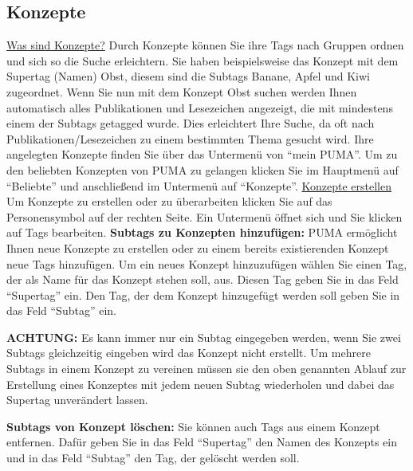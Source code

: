 \documentclass[b5paper,11pt,twoside]{scrbook} %
\begin{document}
\subsection{Konzepte}
\underline{Was sind Konzepte?}
\newline
Durch Konzepte können Sie ihre Tags nach Gruppen ordnen und sich so die Suche erleichtern. Sie haben beispielsweise das Konzept mit dem Supertag (Namen) Obst, diesem sind die Subtags Banane, Apfel und Kiwi zugeordnet. Wenn Sie nun mit dem Konzept Obst suchen werden Ihnen automatisch alles Publikationen und Lesezeichen angezeigt, die mit mindestens einem der Subtags getagged wurde. Dies erleichtert Ihre Suche, da oft nach Publikationen/Lesezeichen zu einem bestimmten Thema gesucht wird. 
\newline Ihre angelegten Konzepte finden Sie über das Untermenü von \enquote{mein PUMA}. Um zu den beliebten Konzepten von PUMA zu gelangen klicken Sie im Hauptmenü auf \enquote{Beliebte} und anschließend im Untermenü auf \enquote{Konzepte}. 
\newline
\newline
\underline{Konzepte erstellen}
\newline
Um Konzepte zu erstellen oder zu überarbeiten klicken Sie auf das Personensymbol auf der rechten Seite. Ein Untermenü öffnet sich und Sie klicken auf Tags bearbeiten. 
\newline
\newline %
\textbf{Subtags zu Konzepten hinzufügen:} PUMA ermöglicht Ihnen neue Konzepte zu erstellen oder zu einem bereits existierenden Konzept neue Tags hinzufügen. Um ein neues Konzept hinzuzufügen wählen Sie einen Tag, der als Name für das Konzept stehen soll, aus. Diesen Tag geben Sie in das Feld \enquote{Supertag} ein. Den Tag, der dem Konzept hinzugefügt werden soll geben Sie in das Feld \enquote{Subtag} ein.
\begin{shaded} \centering\textbf{ACHTUNG:} Es kann immer nur ein Subtag eingegeben werden, wenn Sie zwei Subtags gleichzeitig eingeben wird das Konzept nicht erstellt. Um mehrere Subtags in einem Konzept zu vereinen müssen sie den oben genannten Ablauf zur Erstellung eines Konzeptes mit jedem neuen Subtag wiederholen und dabei das Supertag unverändert lassen. 
\end{shaded}
\textbf{Subtags von Konzept löschen:} Sie können auch Tags aus einem Konzept entfernen. Dafür geben Sie in das Feld \enquote{Supertag} den Namen des Konzepts ein und in das Feld \enquote{Subtag} den Tag, der gelöscht werden soll. 
\end{document}
